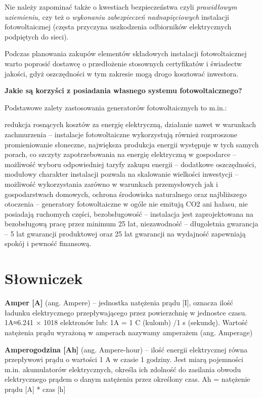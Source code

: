 \documentclass[12pt,a4paper]{article}
\begin{document}
Nie należy zapominać także o kwestiach bezpieczeństwa czyli\textit{ prawidłowym uziemieniu,} czy też o\textit{ wykonaniu zabezpieczeń nadnapięciowych} instalacji fotowoltaicznej (częsta przyczyna uszkodzenia odbiorników elektrycznych podpiętych do sieci).

Podczas planowania zakupów elementów składowych instalacji fotowoltaicznej warto poprosić dostawcę o przedłożenie stosownych certyfikatów i świadectw jakości, gdyż oszczędności w tym zakresie mogą drogo kosztować inwestora.


\textbf{Jakie są korzyści z posiadania własnego systemu fotowoltaicznego?}

Podstawowe zalety zastosowania generatorów fotowoltaicznych to m.in.:

redukcja rosnących kosztów za energię elektryczną,
działanie nawet w warunkach zachmurzenia – instalacje fotowoltaiczne wykorzystują również rozproszone promieniowanie słoneczne,
największa produkcja energii występuje w tych samych porach, co szczyty zapotrzebowania na energię elektryczną w gospodarce – możliwość wyboru odpowiedniej taryfy zakupu energii – dodatkowe oszczędności,
modułowy charakter instalacji pozwala na skalowanie wielkości inwestycji – możliwość wykorzystania zarówno w warunkach przemysłowych jak i gospodarstwach domowych,
ochrona środowiska naturalnego oraz najbliższego otoczenia – generatory fotowoltaiczne w ogóle nie emitują CO2 ani hałasu, nie posiadają ruchomych części,
bezobsługowość – instalacja jest zaprojektowana na bezobsługową pracę przez minimum 25 lat,
niezawodność – długoletnia gwarancja – 5 lat gwarancji produktowej oraz 25 lat gwarancji na wydajność zapewniają spokój i pewność finansową.



\clearpage

\section{Słowniczek}
\textbf{Amper [A]} (ang. Ampere) – jednostka natężenia prądu [I], oznacza ilość ładunku elektrycznego przepływającego przez powierzchnię w jednostce czasu. 1A≈6.241 × 1018 elektronów lub: 1A = 1 C (kulomb) /1 s (sekundę). Wartość natężenia prądu wyrażoną w amperach nazywamy amperażem (ang. Amperage)

\textbf{Amperogodzina [Ah]} (ang. Ampere-hour) – ilość energii elektrycznej równa przepływowi prądu o wartości 1 A w czasie 1 godziny. Jest miarą pojemności m.in. akumulatorów elektrycznych, określa ich zdolność do zasilania obwodu elektrycznego prądem o danym natężeniu przez określony czas.
Ah = natężenie prądu  [A] * czas [h]
\end{document}
